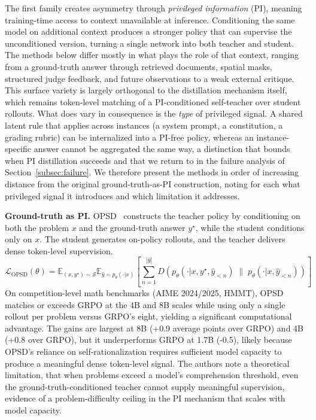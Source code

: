\documentclass{article} %
\newcommand{\E}{\mathbb{E}}
\newcommand{\ptheta}{p_\theta}
\newcommand{\loss}{\mathcal{L}}
\begin{document}
The first family creates asymmetry through \emph{privileged information} (PI), meaning training-time access to context unavailable at inference. Conditioning the same model on additional context produces a stronger policy that can supervise the unconditioned version, turning a single network into both teacher and student. The methods below differ mostly in what plays the role of that context, ranging from a ground-truth answer through retrieved documents, spatial masks, structured judge feedback, and future observations to a weak external critique. This surface variety is largely orthogonal to the distillation mechanism itself, which remains token-level matching of a PI-conditioned self-teacher over student rollouts. What does vary in consequence is the \emph{type} of privileged signal. A shared latent rule that applies across instances (a system prompt, a constitution, a grading rubric) can be internalized into a PI-free policy, whereas an instance-specific answer cannot be aggregated the same way, a distinction that bounds when PI distillation succeeds and that we return to in the failure analysis of Section~\ref{subsec:failure}. We therefore present the methods in order of increasing distance from the original ground-truth-as-PI construction, noting for each what privileged signal it introduces and which limitation it addresses.

\textbf{Ground-truth as PI.} OPSD~\citep{2601.18734} constructs the teacher policy by conditioning on both the problem $x$ and the ground-truth answer $y^\star$, while the student conditions only on $x$. The student generates on-policy rollouts, and the teacher delivers dense token-level supervision.
\begin{equation*}
    \loss_{\text{OPSD}}(\theta) = \E_{(x, y^\star) \sim \mathcal{S}} \E_{\hat{y} \sim \ptheta(\cdot|x)} \left[ \sum_{n=1}^{|\hat{y}|} D\!\left( p_\theta(\cdot|x, y^\star, \hat{y}_{<n}) \;\|\; \ptheta(\cdot|x, \hat{y}_{<n}) \right) \right]
\end{equation*}
On competition-level math benchmarks (AIME 2024/2025, HMMT), OPSD matches or exceeds GRPO at the 4B and 8B scales while using only a single rollout per problem versus GRPO's eight, yielding a significant computational advantage. The gains are largest at 8B (+0.9 average points over GRPO) and 4B (+0.8 over GRPO), but it underperforms GRPO at 1.7B (-0.5), likely because OPSD's reliance on self-rationalization requires sufficient model capacity to produce a meaningful dense token-level signal. The authors note a theoretical limitation, that when problems exceed a model's comprehension threshold, even the ground-truth-conditioned teacher cannot supply meaningful supervision, evidence of a problem-difficulty ceiling in the PI mechanism that scales with model capacity.
\end{document}
